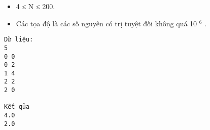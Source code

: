 \begin{itemize}
	\item     4 ≤ N ≤ 200.   
	\item     Các tọa độ là các số nguyên có trị tuyệt đối không quá 10    $^     6    $    .   
\end{itemize}
\begin{verbatim}
Dữ liệu:
5
0 0
0 2
1 4
2 2
2 0

Kết qủa
4.0
2.0
\end{verbatim}